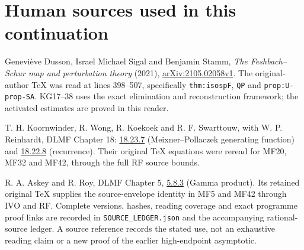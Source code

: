 \documentclass[11pt]{article}
\begin{document}
\section*{Human sources used in this continuation}
Geneviève Dusson, Israel Michael Sigal and Benjamin Stamm,
\emph{The Feshbach--Schur map and perturbation theory} (2021),
\href{https://arxiv.org/abs/2105.02058v1}{arXiv:2105.02058v1}.
The original-author TeX was read at lines 398--507, specifically
\texttt{thm:isospF}, \texttt{QP} and \texttt{prop:U-prop-SA}.
KG17--38 uses the exact elimination and reconstruction framework;
the activated estimates are proved in this reader.

T. H. Koornwinder, R. Wong, R. Koekoek and R. F. Swarttouw,
with W. P. Reinhardt, DLMF Chapter 18:
\href{https://dlmf.nist.gov/18.23.E7}{18.23.7}
(Meixner--Pollaczek generating function) and
\href{https://dlmf.nist.gov/18.22.E8}{18.22.8}
(recurrence). Their original TeX equations were reread for MF20,
MF32 and MF42, through the full RF source bounds.

R. A. Askey and R. Roy, DLMF Chapter 5,
\href{https://dlmf.nist.gov/5.8.E3}{5.8.3} (Gamma product).
Its retained original TeX supplies the source-envelope identity in
MF5 and MF42 through IVO and RF. Complete versions, hashes,
reading coverage and exact programme proof links are recorded in
\texttt{SOURCE\_LEDGER.json} and the accompanying rational-source
ledger. A source reference records the stated use, not an exhaustive
reading claim or a new proof of the earlier high-endpoint asymptotic.
\end{document}
